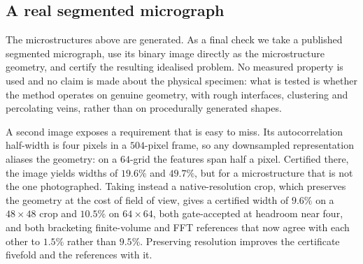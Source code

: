\subsection{A real segmented micrograph}
\label{sec:limits:micrograph}

The microstructures above are generated. As a final check we take a
published segmented micrograph, use its binary image directly as the
microstructure geometry, and certify the resulting idealised problem. No
measured property is used and no claim is made about the physical
specimen: what is tested is whether the method operates on genuine geometry, with rough interfaces, clustering and percolating veins, rather than on
procedurally generated shapes.

\begin{table}[t]
\centering
\caption{Certifying a real segmented micrograph ($32\times32$ crop, phase
fraction $0.802$, nominal contrast $10$). References: FV $6.0477$, FFT
$6.8094$; Voigt--Reuss width $78.3\%$. The quality gate rejects the two
coarser runs, and the accepted certificate is slightly wider than the
rejected one it replaces.}
\label{tab:micrograph}

\end{table}

A second image exposes a requirement that is easy to miss. Its
autocorrelation half-width is four pixels in a $504$-pixel frame, so any
downsampled representation aliases the geometry: on a $64$-grid the
features span half a pixel. Certified there, the image yields widths of
$19.6\%$ and $49.7\%$, but for a microstructure that is not the one
photographed. Taking instead a native-resolution crop, which preserves the
geometry at the cost of field of view, gives a certified width of
$9.6\%$ on a $48\times48$ crop and $10.5\%$ on $64\times64$, both
gate-accepted at headroom near four, and both bracketing finite-volume and
FFT references that now agree with each other to $1.5\%$ rather than
$9.5\%$. Preserving resolution improves the certificate fivefold and the
references with it.

